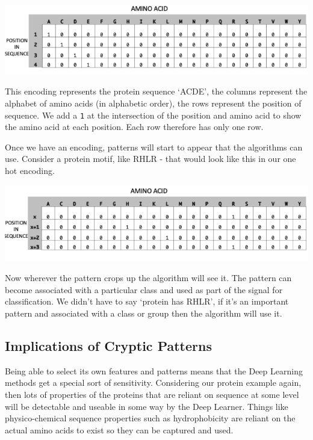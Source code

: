 \documentclass[
]{book}
\begin{document}
\includegraphics{figs/onehot.png}

This encoding represents the protein sequence `ACDE', the columns represent the alphabet of amino acids (in alphabetic order), the rows represent the position of sequence. We add a \texttt{1} at the intersection of the position and amino acid to show the amino acid at each position. Each row therefore has only one row.

Once we have an encoding, patterns will start to appear that the algorithms can use. Consider a protein motif, like RHLR - that would look like this in our one hot encoding.

\includegraphics{figs/rhlr.png}

Now wherever the pattern crops up the algorithm will see it. The pattern can become associated with a particular class and used as part of the signal for classification. We didn't have to say `protein has RHLR', if it's an important pattern and associated with a class or group then the algorithm will use it.

\hypertarget{implications-of-cryptic-patterns}{%
\subsection{Implications of Cryptic Patterns}\label{implications-of-cryptic-patterns}}

Being able to select its own features and patterns means that the Deep Learning methods get a special sort of sensitivity. Considering our protein example again, then lots of properties of the proteins that are reliant on sequence at some level will be detectable and useable in some way by the Deep Learner. Things like physico-chemical sequence properties such as hydrophobicity are reliant on the actual amino acids to exist so they can be captured and used.
\end{document}
